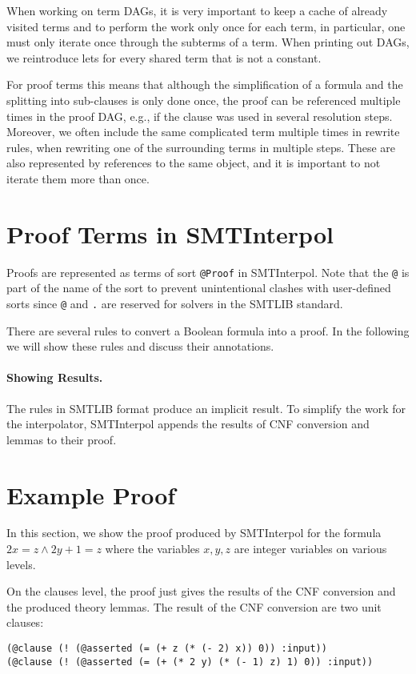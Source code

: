 \documentclass[a4paper]{article}
\newcommand\si{SMTInterpol\xspace}
\begin{document}
When working on term DAGs, it is very important to keep a cache of
already visited terms and to perform the work only once for each term,
in particular, one must only iterate once through the subterms of a
term.  When printing out DAGs, we reintroduce lets for every shared
term that is not a constant.

For proof terms this means that although the simplification of a
formula and the splitting into sub-clauses is only done once, the
proof can be referenced multiple times in the proof DAG, e.g., if the
clause was used in several resolution steps.  Moreover, we often
include the same complicated term multiple times in rewrite rules,
when rewriting one of the surrounding terms in multiple steps.  These
are also represented by references to the same object, and it is
important to not iterate them more than once.


\section{Proof Terms in \si}
Proofs are represented as terms of sort \verb+@Proof+ in \si.  Note that the
\verb+@+ is part of the name of the sort to prevent unintentional clashes with
user-defined sorts since \verb+@+ and \verb+.+ are reserved for solvers in the
SMTLIB standard.

There are several rules to convert a Boolean formula into a proof.  In the
following we will show these rules and discuss their annotations.

\paragraph{Showing Results.}  The rules in SMTLIB format produce an implicit
result.  To simplify the work for the interpolator, \si appends the
results of CNF conversion and lemmas to their proof.

\section{Example Proof}
In this section, we show the proof produced by \si for the
formula $2x=z \land 2y + 1 = z$ where the variables $x,y,z$ are integer
variables on various levels.

On the clauses level, the proof just gives the results of the CNF
conversion and the produced theory lemmas.  The result of the CNF
conversion are two unit clauses:
\begin{verbatim}
(@clause (! (@asserted (= (+ z (* (- 2) x)) 0)) :input))
(@clause (! (@asserted (= (+ (* 2 y) (* (- 1) z) 1) 0)) :input))
\end{verbatim}
\end{document}
